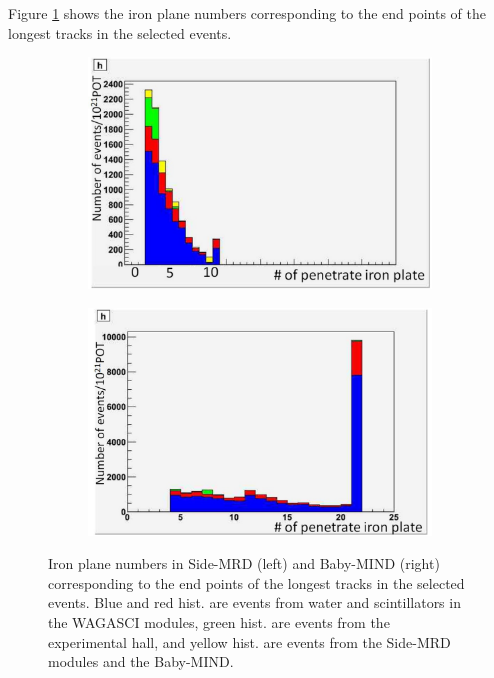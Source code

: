 Figure \ref{fig:endpoint_longest_track_neutrino} shows the iron plane numbers corresponding to the end points of the longest tracks in the selected events.

\begin{figure}[tbh]
  \begin{center}
   \begin{subfigure}{0.48\textwidth}
     \includegraphics[width=\linewidth]{fig/endpoint_sidemrd_longest_track_neutrino.pdf}
    \end{subfigure}
  \begin{subfigure}{0.48\textwidth}
      \includegraphics[width=\linewidth]{fig/endpoint_babymind_longest_track_neutrino.pdf}
    \end{subfigure}    
    \end{center}
  \caption{
Iron plane numbers in Side-MRD (left) and Baby-MIND (right) corresponding to the end points of the longest tracks in the selected events.
Blue and red hist. are events from water and scintillators in the WAGASCI modules, green hist. are events from the experimental hall, and yellow hist. are events from the Side-MRD modules and the Baby-MIND.
}
\label{fig:endpoint_longest_track_neutrino}
\end{figure}


